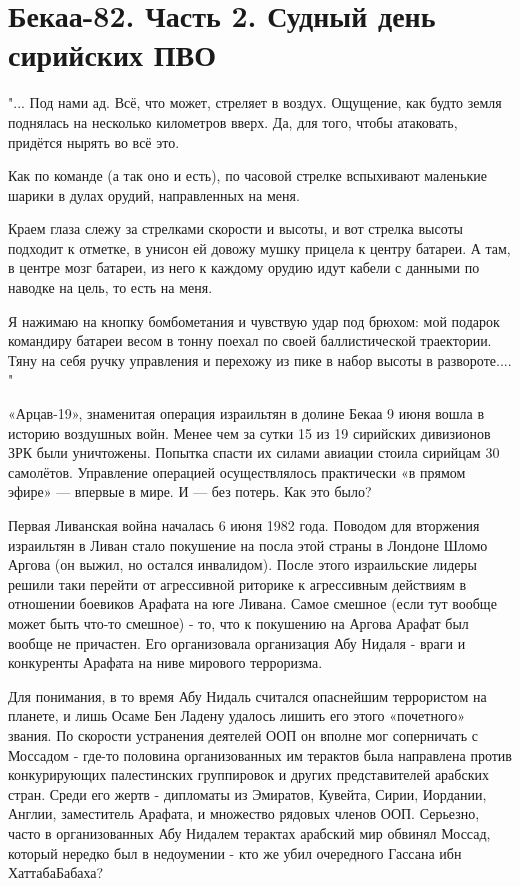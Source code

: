 \chapter{Бекаа-82. Часть 2. Судный день сирийских ПВО}
\begin{remark}
	"... Под нами ад. Всё, что может, стреляет в воздух. Ощущение, как будто земля поднялась на несколько километров вверх. Да, для того, чтобы атаковать, придётся нырять во всё это.
	
	Как по команде (а так оно и есть), по часовой стрелке вспыхивают маленькие шарики в дулах орудий, направленных на меня.
	
	Краем глаза слежу за стрелками скорости и высоты, и вот стрелка высоты подходит к отметке, в унисон ей довожу мушку прицела к центру батареи. А там, в центре мозг батареи, из него к каждому орудию идут кабели с данными по наводке на цель, то есть на меня.
	
	Я нажимаю на кнопку бомбометания и чувствую удар под брюхом: мой подарок командиру батареи весом в тонну поехал по своей баллистической траектории. Тяну на себя ручку управления и перехожу из пике в набор высоты в развороте.... "
\end{remark}

«Арцав-19», знаменитая операция израильтян в долине Бекаа 9 июня вошла в историю воздушных войн. Менее чем за сутки 15 из 19 сирийских дивизионов ЗРК были уничтожены. Попытка спасти их силами авиации стоила сирийцам 30 самолётов. Управление операцией осуществлялось практически «в прямом эфире» — впервые в мире. И — без потерь. Как это было?

Первая Ливанская война началась 6 июня 1982 года. Поводом для вторжения израильтян в Ливан стало покушение на посла этой страны в Лондоне Шломо Аргова (он выжил, но остался инвалидом). После этого израильские лидеры решили таки перейти от агрессивной риторике к агрессивным действиям в отношении боевиков Арафата на юге Ливана. Самое смешное (если тут вообще может быть что-то смешное) - то, что к покушению на Аргова Арафат был вообще не причастен. Его организовала организация Абу Нидаля - враги и конкуренты Арафата на ниве мирового терроризма.

Для понимания, в то время Абу Нидаль считался опаснейшим террористом на планете, и лишь Осаме Бен Ладену удалось лишить его этого «почетного» звания. По скорости устранения деятелей ООП он вполне мог соперничать с Моссадом - где-то половина организованных им терактов была направлена против конкурирующих палестинских группировок и других представителей арабских стран. Среди его жертв - дипломаты из Эмиратов, Кувейта, Сирии, Иордании, Англии, заместитель Арафата, и множество рядовых членов ООП. Серьезно, часто в организованных Абу Нидалем терактах арабский мир обвинял Моссад, который нередко был в недоумении - кто же убил очередного Гассана ибн ХаттабаБабаха?

